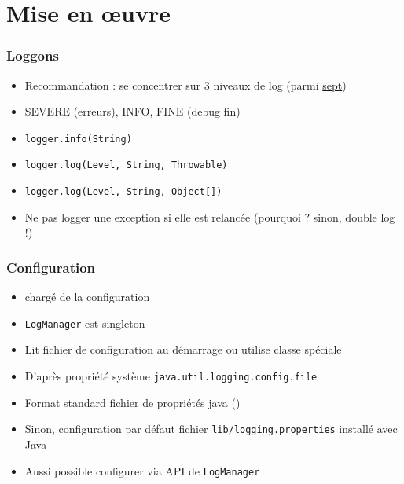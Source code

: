 \documentclass[english, french]{beamer}
\begin{document}
\section{Mise en œuvre}
\begin{frame}
	\frametitle{Loggons}
	\begin{itemize}
		\item Recommandation : se concentrer sur 3 niveaux de log {\tiny (parmi \href{https://docs.oracle.com/javase/8/docs/api/java/util/logging/Level.html}{sept})}
		\item SEVERE (erreurs), INFO, FINE (debug fin)
		\item \texttt{logger.info(String)}
		\item \texttt{logger.log(Level, String, Throwable)}
		\item \texttt{logger.log(Level, String, Object[])}
		\item Ne pas logger une exception si elle est relancée (pourquoi ? \pause sinon, double log !)
	\end{itemize}
\end{frame}

\begin{frame}
	\frametitle{Configuration}
	\begin{itemize}
		\item {} chargé de la configuration
		\item \texttt{LogManager} est singleton
		\item Lit fichier de configuration au démarrage {\tiny ou utilise classe spéciale}
		\item D’après propriété système \texttt{java.util.logging.config.file}
		\item Format standard fichier de propriétés java {\tiny ()}
		\item Sinon, configuration par défaut {\tiny fichier \texttt{lib/logging.properties} installé avec Java}
		\item Aussi possible configurer via API de \texttt{LogManager}
	\end{itemize}
\end{frame}
\end{document}
